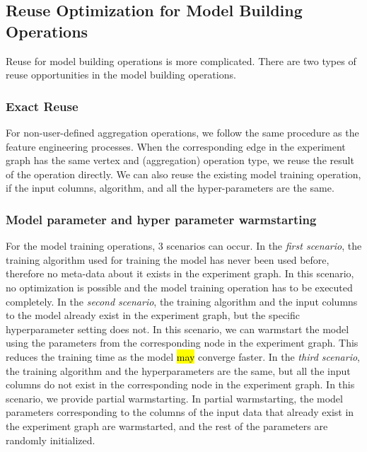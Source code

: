 \subsection{Reuse Optimization for Model Building Operations}
Reuse for model building operations is more complicated.
There are two types of reuse opportunities in the model building operations.

\subsubsection{Exact Reuse}\label{sub-sub-exact-reuse}
For non-user-defined aggregation operations, we follow the same procedure as the feature engineering processes.
When the corresponding edge in the experiment graph has the same vertex and (aggregation) operation type, we reuse the result of the operation directly.
We can also reuse the existing model training operation, if the input columns, algorithm, and all the hyper-parameters are the same.

\subsubsection{Model parameter and hyper parameter warmstarting}\label{sub-sub-model-reuse}
For the model training operations, 3 scenarios can occur.
In the \textit{first scenario}, the training algorithm used for training the model has never been used before, therefore no meta-data about it exists in the experiment graph.
In this scenario, no optimization is possible and the model training operation has to be executed completely.
In the \textit{second scenario}, the training algorithm and the input columns to the model already exist in the experiment graph, but the specific hyperparameter setting does not.
In this scenario, we can warmstart the model using the parameters from the corresponding node in the experiment graph.
This reduces the training time as the model \hl{may} converge faster.
In the \textit{third scenario}, the training algorithm and the hyperparameters are the same, but all the input columns do not exist in the corresponding node in the experiment graph.
In this scenario, we provide partial warmstarting.
In partial warmstarting, the model parameters corresponding to the columns of the input data that already exist in the experiment graph are warmstarted, and the rest of the parameters are randomly initialized.

